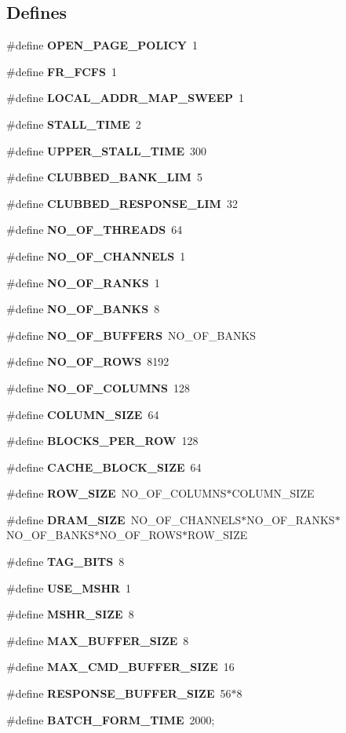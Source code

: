 \subsection*{Defines}
\begin{CompactItemize}
\item 
\#define {\bf OPEN\_\-PAGE\_\-POLICY}~1
\item 
\#define {\bf FR\_\-FCFS}~1
\item 
\#define {\bf LOCAL\_\-ADDR\_\-MAP\_\-SWEEP}~1
\item 
\#define {\bf STALL\_\-TIME}~2
\item 
\#define {\bf UPPER\_\-STALL\_\-TIME}~300
\item 
\#define {\bf CLUBBED\_\-BANK\_\-LIM}~5
\item 
\#define {\bf CLUBBED\_\-RESPONSE\_\-LIM}~32
\item 
\#define {\bf NO\_\-OF\_\-THREADS}~64
\item 
\#define {\bf NO\_\-OF\_\-CHANNELS}~1
\item 
\#define {\bf NO\_\-OF\_\-RANKS}~1
\item 
\#define {\bf NO\_\-OF\_\-BANKS}~8
\item 
\#define {\bf NO\_\-OF\_\-BUFFERS}~NO\_\-OF\_\-BANKS
\item 
\#define {\bf NO\_\-OF\_\-ROWS}~8192
\item 
\#define {\bf NO\_\-OF\_\-COLUMNS}~128
\item 
\#define {\bf COLUMN\_\-SIZE}~64
\item 
\#define {\bf BLOCKS\_\-PER\_\-ROW}~128
\item 
\#define {\bf CACHE\_\-BLOCK\_\-SIZE}~64
\item 
\#define {\bf ROW\_\-SIZE}~NO\_\-OF\_\-COLUMNS$\ast$COLUMN\_\-SIZE
\item 
\#define {\bf DRAM\_\-SIZE}~NO\_\-OF\_\-CHANNELS$\ast$NO\_\-OF\_\-RANKS$\ast$NO\_\-OF\_\-BANKS$\ast$NO\_\-OF\_\-ROWS$\ast$ROW\_\-SIZE
\item 
\#define {\bf TAG\_\-BITS}~8
\item 
\#define {\bf USE\_\-MSHR}~1
\item 
\#define {\bf MSHR\_\-SIZE}~8
\item 
\#define {\bf MAX\_\-BUFFER\_\-SIZE}~8
\item 
\#define {\bf MAX\_\-CMD\_\-BUFFER\_\-SIZE}~16
\item 
\#define {\bf RESPONSE\_\-BUFFER\_\-SIZE}~56$\ast$8
\item 
\#define {\bf BATCH\_\-FORM\_\-TIME}~2000;
\item 

\end{CompactItemize}
